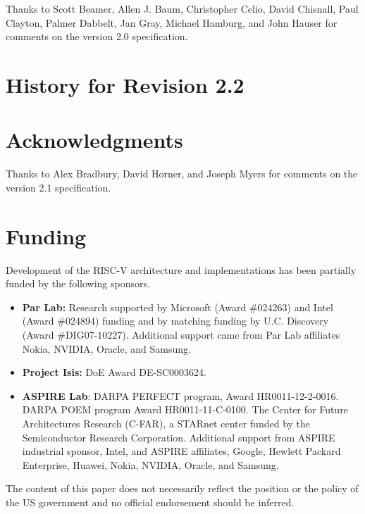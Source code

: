 Thanks to Scott Beamer, Allen J. Baum, Christopher Celio, David Chisnall,
Paul Clayton, Palmer Dabbelt, Jan Gray, Michael Hamburg, and John
Hauser for comments on the version 2.0 specification.

\section{History for Revision 2.2}


\section*{Acknowledgments}

Thanks to Alex Bradbury, David Horner, and Joseph Myers for comments on the
version 2.1 specification.

\section{Funding}

Development of the RISC-V architecture and implementations has been
partially funded by the following sponsors.
\begin{itemize}

\item {\bf Par Lab:} Research supported by Microsoft (Award \#024263) and Intel (Award
    \#024894) funding and by matching funding by U.C. Discovery
    (Award \#DIG07-10227). Additional support came from Par Lab
    affiliates Nokia, NVIDIA, Oracle, and Samsung.

\item {\bf Project Isis:} DoE Award DE-SC0003624.

\item {\bf ASPIRE Lab}: DARPA PERFECT program, Award
    HR0011-12-2-0016.  DARPA POEM program Award HR0011-11-C-0100.  The
    Center for Future Architectures Research (C-FAR), a STARnet center
    funded by the Semiconductor Research Corporation.  Additional
    support from ASPIRE industrial sponsor, Intel, and ASPIRE
    affiliates, Google, Hewlett Packard Enterprise, Huawei, Nokia,
    NVIDIA, Oracle, and Samsung.

\end{itemize}

The content of this paper does not necessarily reflect the position or the
policy of the US government and no official endorsement should be
inferred. 
